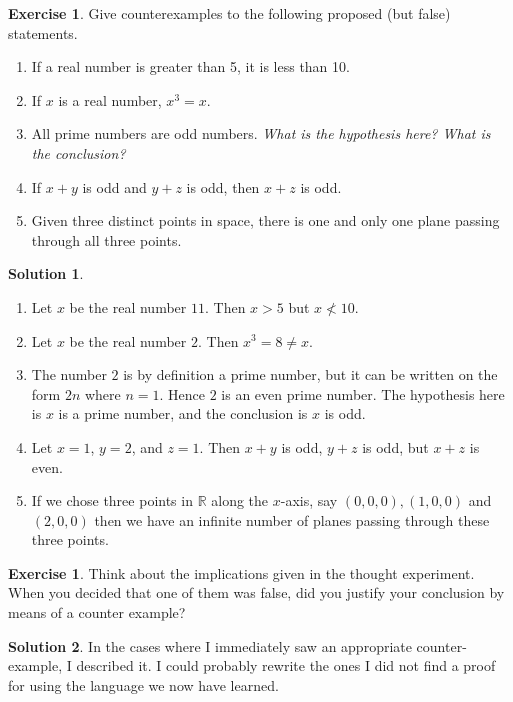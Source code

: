\documentclass[a4paper, 11pt]{report}
\theoremstyle{plain}
\theoremstyle{definition}
\newtheorem{exrc}[thm]{Exercise}
\newtheorem*{sltn}{Solution}
\begin{document}
\begin{exrc}
  Give counterexamples to the following proposed (but false) statements.
  \begin{enumerate}
    \item If a real number is greater than 5, it is less than 10.
    \item If $x$ is a real number, $x^3 = x$.
    \item All prime numbers are odd numbers. \textit{What is the hypothesis
      here? What is the conclusion?}
    \item If $x+y$ is odd and $y+z$ is odd, then $x + z$ is odd.
    \item Given three distinct points in space, there is one and only one plane
      passing through all three points.
  \end{enumerate}
\end{exrc}
\begin{sltn}
  \begin{enumerate}
    \item Let $x$ be the real number $11$. Then $x > 5$ but $x \not< 10$.
    \item Let $x$ be the real number $2$. Then $x^3 = 8 \neq x$.
    \item The number $2$ is by definition a prime number, but it can be written
      on the form $2n$ where $n = 1$. Hence $2$ is an even prime number.  The
      hypothesis here is $x$ is a prime number, and the conclusion is $x$ is
      odd.
    \item Let $x = 1$, $y = 2$, and $z = 1$. Then $x + y$ is odd, $y + z$ is
      odd, but $x + z$ is even.
    \item If we chose three points in $ \mathbb{R}$ along the $x$-axis, say
      $(0, 0, 0), (1, 0, 0)$ and $(2, 0, 0)$ then we have an infinite number of
      planes passing through these three points.
  \end{enumerate}  
\end{sltn}

\begin{exrc}
  Think about the implications given in the thought experiment. When you
  decided that one of them was false, did you justify your conclusion by means
  of a counter example? 
\end{exrc}

\begin{sltn}
  In the cases where I immediately saw an appropriate counter-example, I
  described it.  I could probably rewrite the ones I did not find a proof for
  using the language we now have learned. 
\end{sltn}
\end{document}
